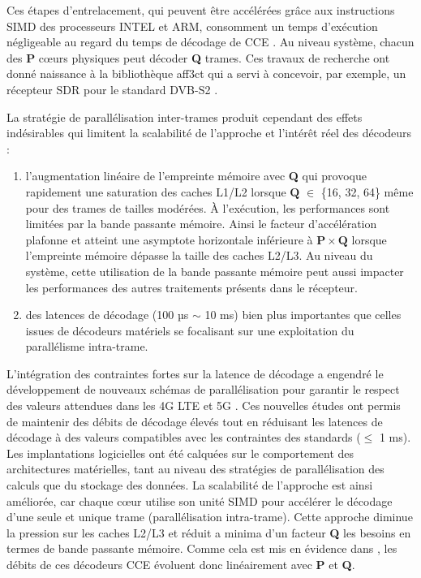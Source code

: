 \documentclass[../main.tex]{subfiles}
\begin{document}
Ces étapes d’entrelacement, qui peuvent être accélérées grâce aux instructions SIMD des processeurs INTEL et ARM, consomment un temps d’exécution négligeable au regard du temps de décodage de CCE \cite{ri:LeG15a}. Au niveau système, chacun des \textbf{P} cœurs physiques peut décoder \textbf{Q} trames. Ces travaux de recherche ont donné naissance à la bibliothèque aff3ct \cite{aff3ct} qui a servi à concevoir, par exemple, un récepteur SDR pour le standard DVB-S2 \cite{Cass21}.


La stratégie de parallélisation inter-trames produit cependant des effets indésirables qui limitent la scalabilité de l’approche et l’intérêt réel des décodeurs :
\begin{enumerate}
    \item l’augmentation linéaire de l’empreinte mémoire avec \textbf{Q} qui provoque rapidement une saturation des caches L1/L2 lorsque $\bm{Q}$ $\in$ \{16, 32, 64\} même pour des trames de tailles modérées. À l’exécution, les performances sont limitées par la bande passante mémoire. Ainsi le facteur d’accélération plafonne et atteint une asymptote horizontale inférieure à $\bm{P} \times \bm{Q}$ lorsque l’empreinte mémoire dépasse la taille des caches L2/L3. Au niveau du système, cette utilisation de la bande passante mémoire peut aussi impacter les performances des autres traitements présents dans le récepteur.
    \item des latences de décodage (100 µs $\sim$ 10 ms) bien plus importantes que celles issues de décodeurs matériels se focalisant sur une exploitation du parallélisme intra-trame.
\end{enumerate}


L’intégration des contraintes fortes sur la latence de décodage a engendré le développement de nouveaux schémas de parallélisation \cite{BLG:SIPS:LDPC,BLG:LDPC:NB,LEONARDON:SCL,BLG:TURBO,mcgill} pour garantir le respect des valeurs attendues dans les 4G LTE \cite{Ref_4G} et 5G \cite{5g}. Ces nouvelles études ont permis de maintenir des débits de décodage élevés tout en réduisant les latences de décodage à des valeurs compatibles avec les contraintes des standards ($\leq $ 1 ms). Les implantations logicielles ont été calquées sur le comportement des architectures matérielles, tant au niveau des stratégies de parallélisation des calculs que du stockage des données. La scalabilité de l'approche est ainsi améliorée, car chaque cœur utilise son unité SIMD pour accélérer le décodage d'une seule et unique trame (parallélisation intra-trame). Cette approche diminue la pression sur les caches L2/L3 et réduit a minima d'un facteur \textbf{Q} les besoins en termes de bande passante mémoire. Comme cela est mis en évidence dans \cite{BLG:TURBO}, les débits de ces décodeurs CCE évoluent donc linéairement avec \textbf{P} et \textbf{Q}.
\end{document}
